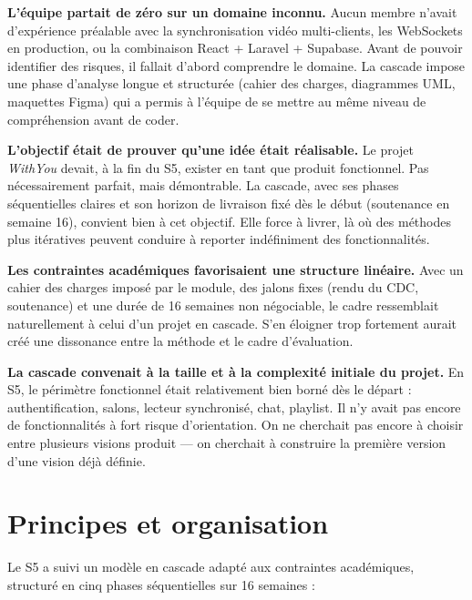 \documentclass[11pt,a4paper]{report}
\begin{document}
\textbf{L'équipe partait de zéro sur un domaine inconnu.} Aucun membre n'avait d'expérience préalable avec la synchronisation vidéo multi-clients, les WebSockets en production, ou la combinaison React + Laravel + Supabase. Avant de pouvoir identifier des risques, il fallait d'abord comprendre le domaine. La cascade impose une phase d'analyse longue et structurée (cahier des charges, diagrammes UML, maquettes Figma) qui a permis à l'équipe de se mettre au même niveau de compréhension avant de coder.

\textbf{L'objectif était de prouver qu'une idée était réalisable.} Le projet \textit{WithYou} devait, à la fin du S5, exister en tant que produit fonctionnel. Pas nécessairement parfait, mais démontrable. La cascade, avec ses phases séquentielles claires et son horizon de livraison fixé dès le début (soutenance en semaine 16), convient bien à cet objectif. Elle force à livrer, là où des méthodes plus itératives peuvent conduire à reporter indéfiniment des fonctionnalités.

\textbf{Les contraintes académiques favorisaient une structure linéaire.} Avec un cahier des charges imposé par le module, des jalons fixes (rendu du CDC, soutenance) et une durée de 16 semaines non négociable, le cadre ressemblait naturellement à celui d'un projet en cascade. S'en éloigner trop fortement aurait créé une dissonance entre la méthode et le cadre d'évaluation.

\textbf{La cascade convenait à la taille et à la complexité initiale du projet.} En S5, le périmètre fonctionnel était relativement bien borné dès le départ : authentification, salons, lecteur synchronisé, chat, playlist. Il n'y avait pas encore de fonctionnalités à fort risque d'orientation. On ne cherchait pas encore à choisir entre plusieurs visions produit --- on cherchait à construire la première version d'une vision déjà définie.

\section{Principes et organisation}

Le S5 a suivi un modèle en cascade adapté aux contraintes académiques, structuré en cinq phases séquentielles sur 16 semaines :
\end{document}
